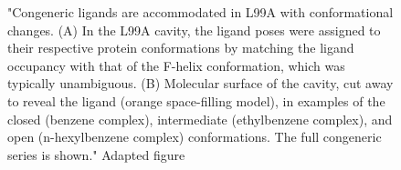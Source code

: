 \documentclass[T4paper.tex]{subfiles}
\begin{document}
\begin{figure}[!ht]
   \caption{"Congeneric ligands are accommodated in L99A with conformational changes. (A) In the L99A cavity, the ligand poses were assigned to their respective protein conformations by matching the ligand occupancy with that of the F-helix conformation, which was typically unambiguous. (B) Molecular surface of the cavity, cut away to reveal the ligand (orange space-filling model), in examples of the closed (benzene complex), intermediate (ethylbenzene complex), and open (n-hexylbenzene complex) conformations. The full congeneric series is shown."
   Adapted figure\cite{Merski2015}}
   \label{fig:loop-occ}
\end{figure}
\end{document}
